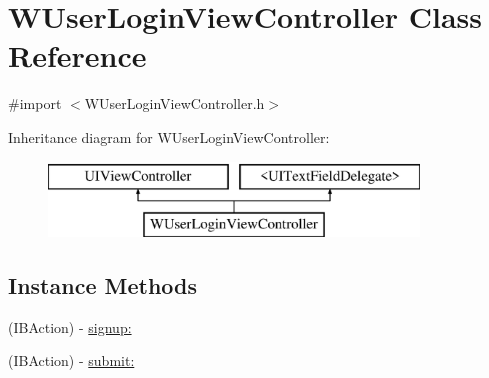\hypertarget{interface_w_user_login_view_controller}{\section{W\-User\-Login\-View\-Controller Class Reference}
\label{interface_w_user_login_view_controller}
}


{\ttfamily \#import $<$W\-User\-Login\-View\-Controller.\-h$>$}

Inheritance diagram for W\-User\-Login\-View\-Controller\-:\begin{figure}[H]
\begin{center}
\leavevmode
\includegraphics[height=2.000000cm]{interface_w_user_login_view_controller}
\end{center}
\end{figure}
\subsection*{Instance Methods}
\begin{DoxyCompactItemize}
\item 
(I\-B\-Action) -\/ \hyperlink{interface_w_user_login_view_controller_a5c01378e68eedd923bc7954f9b2fa536}{signup\-:}
\item 
(I\-B\-Action) -\/ \hyperlink{interface_w_user_login_view_controller_a59719dbcd701d0088018c62051de798a}{submit\-:}
\end{DoxyCompactItemize}
